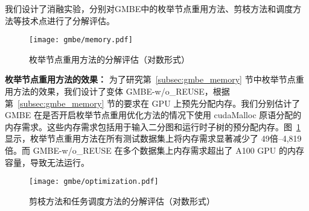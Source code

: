 我们设计了消融实验，分别对GMBE中的枚举节点重用方法、剪枝方法和调度方法等技术点进行了分解评估。

\begin{figure} [H]
	\centering
  \vspace{0.05in}
	\texttt{[image: gmbe/memory.pdf]}	
	\vspace{0.05in}
  \caption{枚举节点重用方法的分解评估（对数形式）}
	\label{fig:gmbe_exp_memory}
\end{figure}



\textbf{枚举节点重用方法的效果：} 为了研究第~\ref{subsec:gmbe_memory} 节中枚举节点重用方法的效果，我们设计了变体 GMBE-w/o\_REUSE，根据第~\ref{subsec:gmbe_memory} 节的要求在 GPU 上预先分配内存。我们分别估计了 GMBE 在是否开启枚举节点重用优化方法的情况下使用 \textsf{cudaMalloc} 原语分配的内存需求。这些内存需求包括用于输入二分图和运行时子树的预分配内存。图~\ref{fig:gmbe_exp_memory} 显示，枚举节点重用方法在所有测试数据集上将内存需求显著减少了 49倍--4,819倍。而 GMBE-w/o\_REUSE 在多个数据集上内存需求超出了 A100 GPU 的内存容量，导致无法运行。




\begin{figure}[t]
	\centering
	\texttt{[image: gmbe/optimization.pdf]}	
  \caption{剪枝方法和任务调度方法的分解评估（对数形式）}
	\label{fig:gmbe_exp_optimization}
\end{figure}


